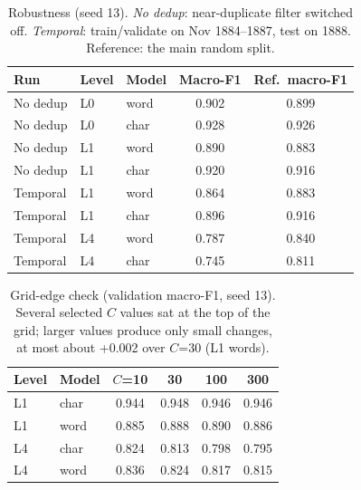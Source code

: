 \begin{table}[h]\centering\small\caption{Robustness (seed 13). \emph{No dedup}: near-duplicate filter switched off. \emph{Temporal}: train/validate on Nov 1884--1887, test on 1888. Reference: the main random split.}
\begin{tabular}{@{}lllcc@{}}\toprule Run & Level & Model & Macro-F1 & Ref.\ macro-F1 \\ \midrule
No dedup & L0 & word & 0.902 & 0.899 \\
No dedup & L0 & char & 0.928 & 0.926 \\
No dedup & L1 & word & 0.890 & 0.883 \\
No dedup & L1 & char & 0.920 & 0.916 \\
Temporal & L1 & word & 0.864 & 0.883 \\
Temporal & L1 & char & 0.896 & 0.916 \\
Temporal & L4 & word & 0.787 & 0.840 \\
Temporal & L4 & char & 0.745 & 0.811 \\
\bottomrule\end{tabular}\label{tab:s2}\end{table}
\begin{table}[h]\centering\small\caption{Grid-edge check (validation macro-F1, seed 13). Several selected $C$ values sat at the top of the grid; larger values produce only small changes, at most about +0.002 over $C$=30 (L1 words).}
\begin{tabular}{@{}llcccc@{}}\toprule Level & Model & $C$=10 & 30 & 100 & 300 \\ \midrule
L1 & char & 0.944 & 0.948 & 0.946 & 0.946 \\
L1 & word & 0.885 & 0.888 & 0.890 & 0.886 \\
L4 & char & 0.824 & 0.813 & 0.798 & 0.795 \\
L4 & word & 0.836 & 0.824 & 0.817 & 0.815 \\
\bottomrule\end{tabular}\label{tab:s3}\end{table}
